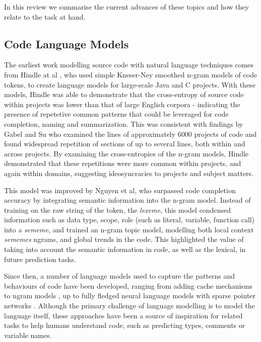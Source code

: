 In this review we summarise the current advances of these topics and how they relate to the task at hand.  


\subsection{Code Language Models} %
\label{ssub:language_models}

The earliest work modelling source code with natural language techniques comes from Hindle at al \cite{hindle_naturalness_nodate}, who used simple Kneser-Ney smoothed n-gram models of code tokens, to create language models for large-scale Java and C projects.
With these models, Hindle was able to demonstrate that the cross-entropy of source code within projects was lower than that of large English corpora - indicating the presence of repetetive common patterns that could be leveraged for code completion, naming and summarization.
This was consistent with findings by Gabel and Su \cite{gabel_study_2010} who examined the lines of approximately 6000 projects of code and found widespread repetition of sections of up to several lines, both within and across projects.
By examining the cross-entropies of the n-gram models, Hindle demonstrated that these repetitions were more common within projects, and again within domains, suggesting ideosyncracies to projects and subject matters\cite{hindle_naturalness_nodate}.

This model was improved by Nguyen et al\cite{nguyen_statistical_2013}, who surpassed code completion accuracy by integrating semantic information into the n-gram model.
Instead of training on the raw string of the token, the \textit{lexeme}, this model condensed information such as data type, scope, role (such as literal, variable, function call) into a \textit{sememe}, and trained an n-gram topic model, modelling both local context \textit{sememes} ngrams, and global trends in the code.
This highlighted the value of taking into account the semantic information in code, as well as the lexical, in future prediction tasks.

Since then, a number of language models used to capture the patterns and behaviours of code have been developed, ranging from adding cache mechanisms to ngram models \cite{tu_localness_nodate}, up to fully fledged neural language models with sparse pointer networks \cite{bhoopchand_learning_2016}. 
Although the primary challenge of language modelling is to model the language itself, these approaches have been a source of inspiration for related tasks to help humans understand code, such as predicting types, comments or variable names.

